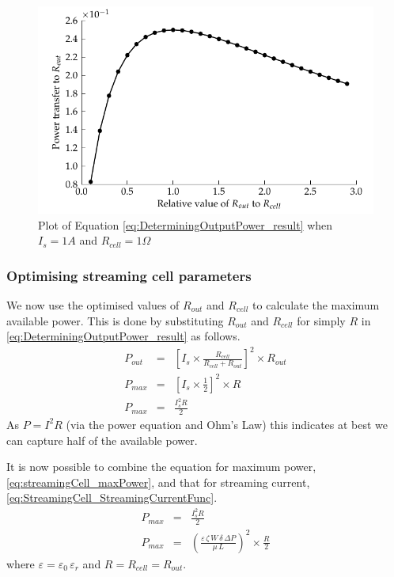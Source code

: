 \begin{figure}
    \centering
        \includegraphics{content/pt1/01-PowerHarvesting/graphics/maximumPowerThereom}
    \caption{\label{fig:Plot-of-PowerTheorem}Plot of Equation \ref{eq:DeterminingOutputPower_result} when $I_{s}=1A$ and $R_{cell}=1\Omega$}
\end{figure}

\subsubsection*{Optimising streaming cell parameters}

We now use the optimised values of $R_{out}$ and $R_{cell}$ to calculate the maximum available power.
This is done by substituting $R_{out}$ and $R_{cell}$ for simply $R$ in \eqref{eq:DeterminingOutputPower_result} as follows.
\begin{eqnarray}
    P_{out} & = & \left[I_{s}\times\frac{R_{cell}}{R_{cell}+R_{out}}\right]^{2}\times R_{out}\nonumber \\
    P_{max} & = & \left[I_{s}\times\frac{1}{2}\right]^{2}\times R\nonumber \\
    P_{max} & = & \frac{I_{s}^{2}R}{2}
    \label{eq:streamingCell_maxPower}
\end{eqnarray}
As $P=I^{2}R$ (via the power equation and Ohm's Law) this indicates at best we can capture half of the available power.

It is now possible to combine the equation for maximum power, \eqref{eq:streamingCell_maxPower}, and that for streaming current, \eqref{eq:StreamingCell_StreamingCurrentFunc}.
\begin{eqnarray}
    P_{max} & = & \frac{I_{s}^{2}R}{2}\nonumber \\
    P_{max} & = & \left(\frac{\varepsilon\,\zeta\,W\,\delta\,\Delta P}{\mu\,L}\right)^{2}\times\frac{R}{2}
    \label{eq:streamingCell_maxPower_substituted}
\end{eqnarray}
where $\varepsilon=\varepsilon_{0}\,\varepsilon_{r}$ and $R=R_{cell}=R_{out}$.

